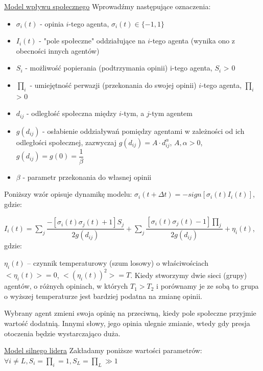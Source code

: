 \underline{Model wpływu społecznego}\newline
Wprowadźmy następujące oznaczenia:
\begin{itemize}
	\item $ \sigma_i(t) $ - opinia $ i $-tego agenta, $ \sigma_i(t) \in \{-1, 1\} $
	\item $ I_i(t) $ - "pole społeczne" oddziałujące na $ i $-tego agenta (wynika ono z obecności innych agentów)
	\item $ S_i $ - możliwość popierania (podtrzymania opinii) i-tego agenta, $ S_i $ > 0
	\item $ \prod_i $ - umiejętność perwazji (przekonania do swojej opinii) $ i $-tego agenta, $ \prod_i $ > 0
	\item $ d_{ij} $ - odległość społeczna między $ i $-tym, a $ j $-tym agentem
	\item $ g(d_{ij}) $ - osłabienie oddziaływań pomiędzy agentami w zależności od ich odległości społecznej, zazwyczaj $ g(d_{ij}) = A \cdot d_{ij}^{\alpha} $, $A, \alpha > 0 $, $ g(d_{ij}) = g(0) = \dfrac{1}{\beta} $
	\item $ \beta $ - parametr przekonania do własnej opinii
\end{itemize}

Poniższy wzór opisuje dynamikę modelu:\newline
$ \sigma_i(t + \Delta t) = - sign[\sigma_i (t) I_i(t)] $, gdzie:\newline

$ I_i(t) = \sum_j \dfrac{-[\sigma_i(t)\sigma_j(t) + 1]S_j}{2g(d_{ij})} + \sum_j \dfrac{[\sigma_i(t)\sigma_j(t) - 1]\prod_j}{2g(d_{ij})} + \eta_i(t) $, gdzie:\newline

$ \eta_i(t) $ – czynnik temperaturowy (szum losowy) o właściwościach $ <\eta_i(t)> = 0 $,  $ <(\eta_i(t))^2> = T $.
Kiedy stworzymy dwie sieci (grupy) agentów, o różnych opiniach, w których $ T_1 > T_2 $ i porównamy je ze sobą to grupa o wyższej temperaturze jest bardziej podatna na zmianę opinii.

Wybrany agent zmieni swoja opinię na przeciwną, kiedy pole społeczne
przyjmie wartość dodatnią. Innymi słowy, jego opinia ulegnie zmianie, wtedy gdy presja otoczenia będzie wystarczająco duża.

\underline{Model silnego lidera}\newline
Zakładamy poniższe wartości parametrów:\newline
$ \forall i \neq L, S_i = \prod_i = 1, S_L = \prod_L \gg 1 $

